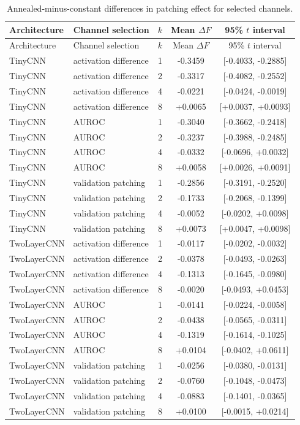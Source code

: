 {
\small
\setlength{\tabcolsep}{4pt}
\begin{longtable}{llrcc}
\caption{Annealed-minus-constant differences in patching effect for selected channels.}\label{tab:prospective-full}\\
\toprule
Architecture & Channel selection & $k$ & Mean $\Delta F$ & 95\% $t$ interval \\
\midrule
\endfirsthead
\toprule
Architecture & Channel selection & $k$ & Mean $\Delta F$ & 95\% $t$ interval \\
\midrule
\endhead
\bottomrule
\endfoot
TinyCNN & activation difference & 1 & -0.3459 & [-0.4033, -0.2885] \\
TinyCNN & activation difference & 2 & -0.3317 & [-0.4082, -0.2552] \\
TinyCNN & activation difference & 4 & -0.0221 & [-0.0424, -0.0019] \\
TinyCNN & activation difference & 8 & +0.0065 & [+0.0037, +0.0093] \\
TinyCNN & AUROC & 1 & -0.3040 & [-0.3662, -0.2418] \\
TinyCNN & AUROC & 2 & -0.3237 & [-0.3988, -0.2485] \\
TinyCNN & AUROC & 4 & -0.0332 & [-0.0696, +0.0032] \\
TinyCNN & AUROC & 8 & +0.0058 & [+0.0026, +0.0091] \\
TinyCNN & validation patching & 1 & -0.2856 & [-0.3191, -0.2520] \\
TinyCNN & validation patching & 2 & -0.1733 & [-0.2068, -0.1399] \\
TinyCNN & validation patching & 4 & -0.0052 & [-0.0202, +0.0098] \\
TinyCNN & validation patching & 8 & +0.0073 & [+0.0047, +0.0098] \\
TwoLayerCNN & activation difference & 1 & -0.0117 & [-0.0202, -0.0032] \\
TwoLayerCNN & activation difference & 2 & -0.0378 & [-0.0493, -0.0263] \\
TwoLayerCNN & activation difference & 4 & -0.1313 & [-0.1645, -0.0980] \\
TwoLayerCNN & activation difference & 8 & -0.0020 & [-0.0493, +0.0453] \\
TwoLayerCNN & AUROC & 1 & -0.0141 & [-0.0224, -0.0058] \\
TwoLayerCNN & AUROC & 2 & -0.0438 & [-0.0565, -0.0311] \\
TwoLayerCNN & AUROC & 4 & -0.1319 & [-0.1614, -0.1025] \\
TwoLayerCNN & AUROC & 8 & +0.0104 & [-0.0402, +0.0611] \\
TwoLayerCNN & validation patching & 1 & -0.0256 & [-0.0380, -0.0131] \\
TwoLayerCNN & validation patching & 2 & -0.0760 & [-0.1048, -0.0473] \\
TwoLayerCNN & validation patching & 4 & -0.0883 & [-0.1401, -0.0365] \\
TwoLayerCNN & validation patching & 8 & +0.0100 & [-0.0015, +0.0214] \\
\end{longtable}
\normalsize
}

